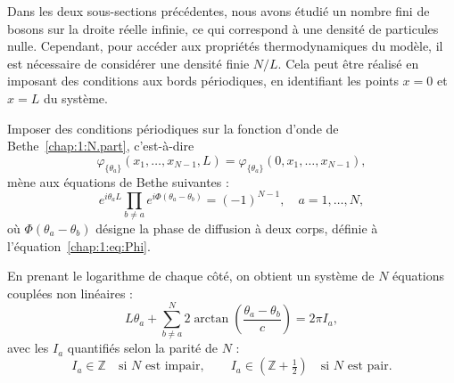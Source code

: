 Dans les deux sous-sections précédentes, nous avons étudié un nombre fini de bosons sur la droite réelle infinie, ce qui correspond à une densité de particules nulle. Cependant, pour accéder aux propriétés thermodynamiques du modèle, il est nécessaire de considérer une densité finie $N/L$. Cela peut être réalisé en imposant des conditions aux bords périodiques, en identifiant les points $x = 0$ et $x = L$ du système.

Imposer des conditions périodiques sur la fonction d’onde de Bethe~\eqref{chap:1:N.part}, c’est-à-dire
\[
\varphi_{\{\theta_a\}}(x_1, \dots, x_{N-1}, L) = \varphi_{\{\theta_a\}}(0, x_1, \dots, x_{N-1}),
\]
mène aux équations de Bethe suivantes :
\begin{equation}
e^{i \theta_a L} \prod_{b \ne a} e^{i \Phi(\theta_a - \theta_b)} = (-1)^{N-1}, \quad a = 1, \dots, N,
\label{eq:bethe_exp}
\end{equation}
où $\Phi(\theta_a - \theta_b)$ désigne la phase de diffusion à deux corps, définie à l'équation~\eqref{chap:1:eq:Phi}.

En prenant le logarithme de chaque côté, on obtient un système de $N$ équations couplées non linéaires :
\begin{equation}
L\theta_a + \sum_{b \ne a}^N 2 \arctan\left( \frac{\theta_a - \theta_b}{c} \right) = 2\pi I_a ,
\label{eq:bethe_log}
\end{equation}
avec les $I_a$ quantifiés selon la parité de $N$ :
\[
I_a \in  \mathbb{Z} \quad \text{si $N$ est impair}, \qquad
I_a \in \left( \mathbb{Z} + \tfrac{1}{2} \right) \quad \text{si $N$ est pair}.
\]